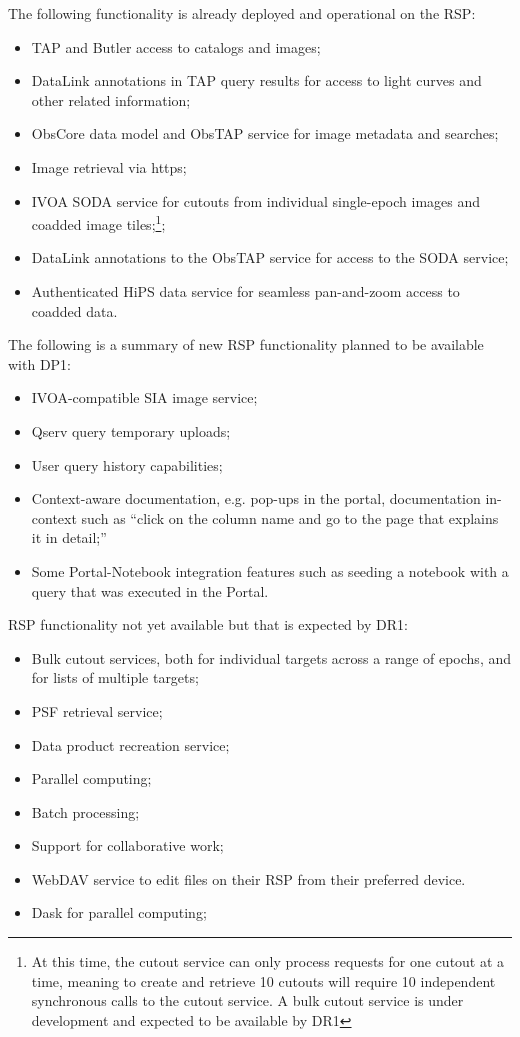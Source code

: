 The following functionality is already deployed and operational on the RSP:
\begin{itemize}
\item TAP and Butler access to catalogs and images;
\item DataLink annotations in TAP query results for access to light curves and other related information;
\item ObsCore data model and ObsTAP service for image metadata and searches;
\item Image retrieval via https;
\item IVOA SODA service for cutouts from individual single-epoch images and coadded image tiles;\footnote{At this time, the cutout service can only process requests for one cutout at a time, meaning to create and retrieve 10 cutouts will require 10 independent synchronous calls to the cutout service. A bulk cutout service is under development and expected to be available by DR1};
\item DataLink annotations to the ObsTAP service for access to the SODA service;
\item Authenticated HiPS data service for seamless pan-and-zoom access to coadded data.
\end{itemize}

The following is a summary of new RSP functionality planned to be available with  DP1: 
\begin{itemize}
\item IVOA-compatible SIA image service;
\item Qserv query temporary uploads;
\item User query history capabilities;
\item Context-aware documentation, e.g. pop-ups in the portal, documentation in-context such as  ``click on the column name and go to the page that explains it in detail;''
\item Some Portal-Notebook integration features such as  seeding a notebook with a query that was executed in the Portal. 
\end{itemize}

RSP functionality not yet available but that is expected by DR1:
\begin{itemize}
\item Bulk cutout services, both for individual targets across a range of epochs, and for lists of multiple targets;
\item PSF retrieval service;
\item Data product recreation service; 
\item Parallel computing;
\item Batch processing; 
\item Support for collaborative work;
\item WebDAV service to edit files on their RSP from their preferred device. 
\item Dask for parallel computing;
\end{itemize} 


